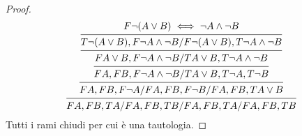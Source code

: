 \begin{proof}
\begin{equation*}
\begin{prooftree}
\hypo{F \neg (A \lor B)  \iff  \neg A \land \neg B}
\infer1 {T \neg(A \lor B),F \neg A \land \neg B/F \neg(A \lor B),T \neg A \land \neg B}
\infer1 {F A \lor B,F \neg A \land \neg B/T A \lor B,T \neg A \land \neg B}
\infer1 {FA,FB,F \neg A \land \neg B/T A \lor B,T \neg A,T \neg B}
\infer1 {FA,FB,F \neg A/FA,FB,F \neg B/FA,FB,T A \lor B}
\infer1 {FA,FB,TA/FA,FB,TB/FA,FB,TA/FA,FB,TB}
\end{prooftree}
\end{equation*}
Tutti i rami chiudi per cui è una tautologia.
\end{proof}

